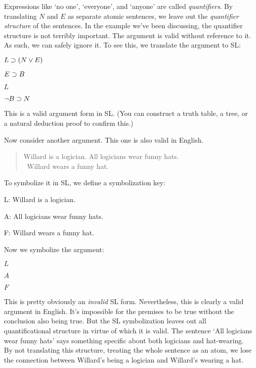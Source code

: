 Expressions like `no one', `everyone', and `anyone' are called \emph{quantifiers}. By translating $N$ and $E$ as separate atomic sentences, we leave out the \emph{quantifier structure} of the sentences. In the example we've been discussing, the quantifier structure is not terribly important. The argument is valid without reference to it. As such, we can safely ignore it. To see this, we translate the argument to SL:
\begin{earg}
\item[]$L \supset (N \vee E)$
\item[]$E \supset B$
\item[]$L$
\item[\therefore]$\neg B \supset N$
\end{earg}
This is a valid argument form in SL. (You can construct a truth table, a tree, or a natural deduction proof to confirm this.) 

Now consider another argument. This one is also valid in English.

\begin{quote}
\label{willard1}
Willard is a logician. All logicians wear funny hats.\\
\therefore\ Willard wears a funny hat.
\end{quote}

To symbolize it in SL, we define a symbolization key:
\begin{ekey}
\item[L:] Willard is a logician.
\item[A:] All logicians wear funny hats.
\item[F:] Willard wears a funny hat.
\end{ekey}

Now we symbolize the argument:
\begin{earg}
\item[]$L$
\item[]$A$
\item[\therefore] $F$
\end{earg}

This is pretty obviously an \emph{invalid} SL form. Nevertheless, this is clearly a valid argument in English. It's impossible for the premises to be true without the conclusion also being true. But the SL symbolization leaves out all quantificational structure in virtue of which it is valid. The sentence `All logicians wear funny hats' says something specific about both logicians and hat-wearing. By not translating this structure, treating the whole sentence as an atom, we lose the connection between Willard's being a logician and Willard's wearing a hat.

